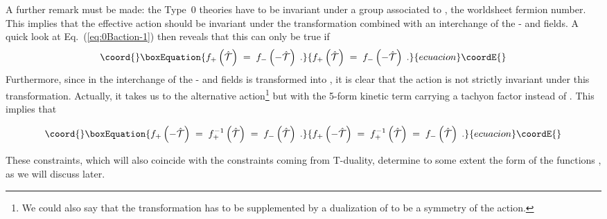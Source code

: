 \documentclass[12pt,a4paper]{article}
\begin{document}
A further remark must be made: the Type~0 theories have to be
invariant under a \coordHE{} group associated to \coordHE{},
the worldsheet fermion number.  This implies that the effective action
should be invariant under the transformation
\coordHE{} combined with an
interchange of the \myHighlight{$^{+}$}\coordHE{}- and \myHighlight{$^{-}$}\coordHE{} fields.  A quick look at
Eq.~(\ref{eq:0Baction-1}) then reveals that this can only be true if
\begin{equation}\coord{}\boxEquation{
  \label{eq:relatie1}
  f_{+}\left(\hat{\mathcal{T}}\right) \;=\;
        f_{-}\left( -\hat{\mathcal{T}}\right) \; .
}{
  f_{+}\left(\hat{\mathcal{T}}\right) \;=\;
        f_{-}\left( -\hat{\mathcal{T}}\right) \; .
}{ecuacion}\coordE{}\end{equation}
Furthermore, since in the interchange of the \myHighlight{$^{+}$}\coordHE{}- and \myHighlight{$^{-}$}\coordHE{} fields
\coordHE{} is transformed into \coordHE{}, it is
clear that the action is not strictly invariant under this
transformation. Actually, it takes us to the alternative
action\footnote{We could also say that the transformation has to be
  supplemented by a dualization of \coordHE{} to be a
  symmetry of the action.} but with the 5-form kinetic term carrying a
tachyon factor \coordHE{} instead of 
\coordHE{}. This implies that 

\begin{equation}\coord{}\boxEquation{
f_{+}\left(-\hat{\mathcal{T}}\right) \;=\;
        f_{+}^{-1}\left(\hat{\mathcal{T}}\right) 
\;=\; f_{-}\left(\hat{\mathcal{T}}\right)\; .
}{
f_{+}\left(-\hat{\mathcal{T}}\right) \;=\;
        f_{+}^{-1}\left(\hat{\mathcal{T}}\right) 
\;=\; f_{-}\left(\hat{\mathcal{T}}\right)\; .
}{ecuacion}\coordE{}\end{equation}

These constraints, which will also coincide with the constraints
coming from T-duality, determine to some extent the form of the
functions \coordHE{}, as we will discuss later.

\end{document}
